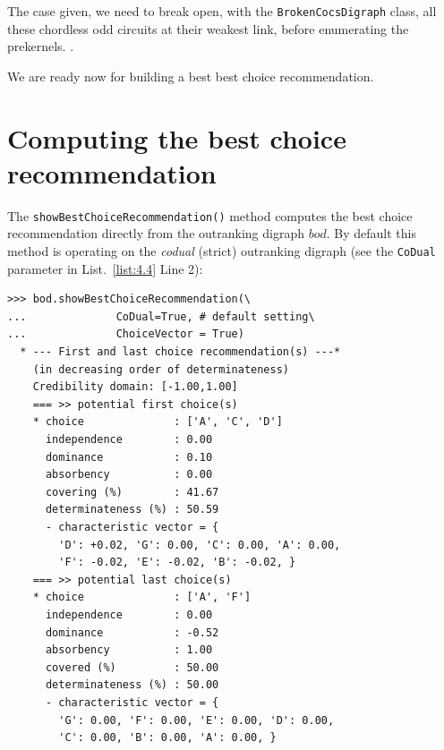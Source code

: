 The case given, we need to break open, with the \texttt{BrokenCocsDigraph} class, all these chordless odd circuits at their weakest link, before enumerating the prekernels. \citep{BIS-2021b}.

We are ready now for building a best best choice recommendation.

\section{Computing the \Rubis best choice recommendation}
\label{sec:4.5}

The \texttt{showBestChoiceRecommendation()} method computes the \Rubis best choice recommendation directly from the outranking digraph $bod$. By default this method is operating on the \emph{codual} (strict) outranking digraph (see the \texttt{CoDual} parameter in List.~\vref{list:4.4} Line 2):
\begin{lstlisting}[caption={Computing the best choice recommendation},label=list:4.4]
>>> bod.showBestChoiceRecommendation(\
...              CoDual=True, # default setting\
...              ChoiceVector = True)   
  * --- First and last choice recommendation(s) ---*
    (in decreasing order of determinateness)   
    Credibility domain: [-1.00,1.00]
    === >> potential first choice(s)
    * choice              : ['A', 'C', 'D']
      independence        : 0.00
      dominance           : 0.10
      absorbency          : 0.00
      covering (%)        : 41.67
      determinateness (%) : 50.59
      - characteristic vector = {
        'D': +0.02, 'G': 0.00, 'C': 0.00, 'A': 0.00,
        'F': -0.02, 'E': -0.02, 'B': -0.02, }
    === >> potential last choice(s) 
    * choice              : ['A', 'F']
      independence        : 0.00
      dominance           : -0.52
      absorbency          : 1.00
      covered (%)         : 50.00
      determinateness (%) : 50.00
      - characteristic vector = {
        'G': 0.00, 'F': 0.00, 'E': 0.00, 'D': 0.00,
        'C': 0.00, 'B': 0.00, 'A': 0.00, }
\end{lstlisting}				  

